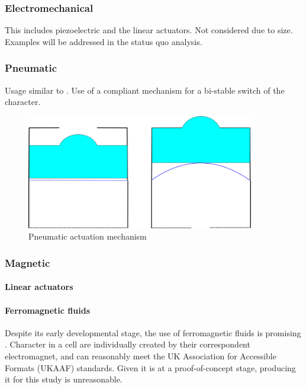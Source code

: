     \subsubsection{Electromechanical}
    This includes piezoelectric and the linear actuators. Not considered due to size. Examples will be addressed in the status quo analysis.

    \subsubsection{Pneumatic}
    Usage similar to \cite{XieZhixin2021A2rB}. Use of a compliant mechanism for a bi-stable switch of the character.  
    \begin{figure}[h]
    \centering
        \includegraphics[height=5cm]{figures/pneumatic.png}
    \caption{Pneumatic actuation mechanism}
    \label{fig:pneumatic.png}
    \end{figure}

    \subsubsection{Magnetic}
    \paragraph{Linear actuators} %

    \paragraph{Ferromagnetic fluids}
    Despite its early developmental stage, the use of ferromagnetic fluids is promising \cite{fletcher_magnetic_2021}.
    Character in a cell are individually created by their correspondent electromagnet, and can reasonably meet the UK Association for Accessible Formats (UKAAF) standards.
    Given it is at a proof-of-concept stage, producing it for this study is unreasonable.

